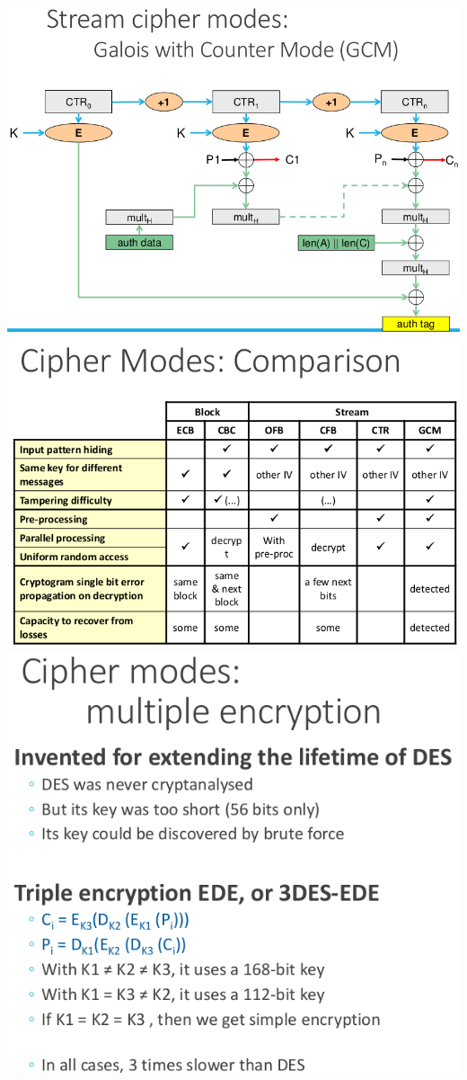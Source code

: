\documentclass{article}
\begin{document}
\begin{center}
  \includegraphics[scale=0.3]{90}
  \includegraphics[scale=0.3]{91}
  \includegraphics[scale=0.3]{92}

\end{center}
\end{document}
